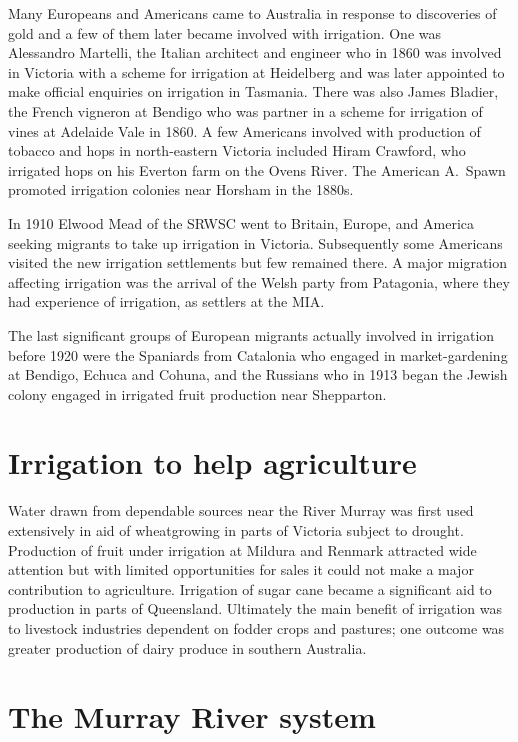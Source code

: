 Many Europeans and Americans came to Australia in response to
discoveries of gold and a few of them later became involved with
irrigation.  One was Alessandro Martelli, the Italian architect and
engineer who in 1860 was involved in Victoria with a scheme for
irrigation at Heidelberg and was later appointed to make official
enquiries on irrigation in Tasmania.  There was also James Bladier,
the French vigneron at Bendigo who was partner in a scheme for
irrigation of vines at Adelaide Vale in 1860.  A few Americans
involved with production of tobacco and hops in north-eastern Victoria
included Hiram Crawford, who irrigated hops on his Everton farm on the
Ovens River.  The American A.~Spawn promoted irrigation colonies near
Horsham in the 1880s.

In 1910 Elwood Mead of the SRWSC went to Britain, Europe, and America
seeking migrants to take up irrigation in Victoria.  Subsequently some
Americans visited the new irrigation settlements but few remained
there.  A major migration affecting irrigation was the arrival of the
Welsh party from Patagonia, where they had experience of irrigation,
as settlers at the MIA.

The last significant groups of European migrants actually involved in
irrigation before 1920 were the Spaniards from Catalonia who engaged
in market-gardening at Bendigo, Echuca and Cohuna, and the Russians
who in 1913 began the Jewish colony engaged in irrigated fruit
production near Shepparton.

\section*{Irrigation to help agriculture}

Water drawn from dependable sources near the River Murray was first
used extensively in aid of wheatgrowing in parts of Victoria subject
to drought.  Production of fruit under irrigation at Mildura and
Renmark attracted wide attention but with limited opportunities for
sales it could not make a major contribution to agriculture.
Irrigation of sugar cane became a significant aid to production in
parts of Queensland.  Ultimately the main benefit of irrigation was to
livestock industries dependent on fodder crops and pastures; one
outcome was greater production of dairy produce in southern Australia.

\section*{The Murray River system}

